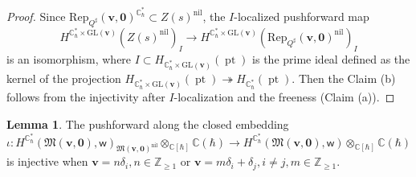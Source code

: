 \documentclass[10pt]{amsart}
\theoremstyle{definition}
\newtheorem{Lemma}[Theorem]{Lemma}
\numberwithin{equation}{section}
\newcommand{\GL}{\mathrm{GL}}
\newcommand{\bC}{\mathbb{C}}
\newcommand{\bZ}{\mathbb{Z}}
\newcommand{\bv}{\mathbf{v}}
\newcommand{\cN}{\mathcal{N}}
\newcommand{\fM}{\mathfrak{M}}
\newcommand{\sw}{\mathsf{w}}
\newcommand{\pr}{\operatorname{pr}}
\newcommand{\pt}{\operatorname{pt}}
\begin{document}
\begin{proof}
Since $\mathrm{Rep}_{Q^\sharp}(\bv,\mathbf 0)^{\bC^*_\hbar}\subset Z(s)^{\mathrm{nil}}$, the $I$-localized pushforward map 
$$H^{\bC^*_\hbar\times \GL(\bv)}\left(Z(s)^{\mathrm{nil}}\right)_I\to  H^{\bC^*_\hbar\times \GL(\bv)}\left(\mathrm{Rep}_{Q^\sharp}(\bv,\mathbf 0)^{\mathrm{nil}}\right)_I$$ is an isomorphism, where $I\subset H_{\bC^*_\hbar\times \GL(\bv)}(\pt)$ is the prime ideal defined as the kernel of the projection $ H_{\bC^*_\hbar\times \GL(\bv)}(\pt)\twoheadrightarrow  H_{\bC^*_\hbar}(\pt)$. Then the Claim (b) follows from the injectivity after $I$-localization and the freeness (Claim (a)).
\end{proof}

\begin{Lemma}\label{lem inj nil}
The pushforward along the closed embedding $$\iota\colon H^{\bC^*_\hbar}(\fM(\bv,\mathbf 0),\sw)_{\fM(\bv,\mathbf 0)^{\mathrm{nil}}}\otimes_{\bC[\hbar]}\bC(\hbar)\to H^{\bC^*_\hbar}(\fM(\bv,\mathbf 0),\sw)\otimes_{\bC[\hbar]}\bC(\hbar)$$ is injective when $\bv=n\delta_i,n\in \bZ_{\geqslant 1}$ or $\bv=m\delta_i+\delta_j,i\neq j,m\in \bZ_{\geqslant 1}$.
\end{Lemma}
\end{document}
